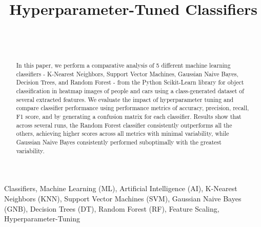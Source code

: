 \documentclass[journal,twocolumn,12pt,twoside]{IEEEtran}
\newcommand{\myabstract}[1]{\begin{abstract}#1\end{abstract}}
\begin{document}
\title{Hyperparameter-Tuned Classifiers}
\author{\\
    \\
}

\maketitle
\myabstract{
    In this paper, we perform a comparative analysis of 5 different machine learning classifiers - K-Nearest Neighbors, Support Vector Machines, Gaussian Naive Bayes, Decision Trees, and Random Forest - from the Python Scikit-Learn library for object classification in heatmap images of people and cars using a class-generated dataset of several extracted features. We evaluate the impact of hyperparameter tuning and compare classifier performance using performance metrics of accuracy, precision, recall, F1 score, and by generating a confusion matrix for each classifier. Results show that across several runs, the Random Forest classifier consistently outperforms all the others, achieving higher scores across all metrics with minimal variability, while Gaussian Naive Bayes consistently performed suboptimally with the greatest variability.
}

\begin{IEEEkeywords}
    Classifiers, Machine Learning (ML), Artificial Intelligence (AI), K-Nearest Neighbors (KNN), Support Vector Machines (SVM), Gaussian Naive Bayes (GNB), Decision Trees (DT), Random Forest (RF), Feature Scaling, Hyperparameter-Tuning
\end{IEEEkeywords}

\end{document}
